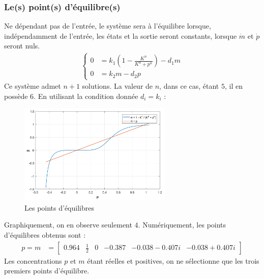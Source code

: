 \documentclass[a4paper, 12pt]{article}
\begin{document}
	\subsubsection{Le(s) point(s) d'équilibre(s)}
	Ne dépendant pas de l'entrée, le système sera à l'équilibre lorsque, indépendamment de l'entrée, les états et la sortie seront constants, \cad lorsque $\dot{m}$ et $\dot{p}$ seront nuls.
	\begin{align}
		\left\{
		\begin{aligned}
			0 & = {k}_{1}\left(1 - \frac{{K}^{n}}{{K}^{n} + {p}^{n}}\right) - {d}_{1}m \\
			0 & = {k}_{2}m - {d}_{2}p
		\end{aligned}
		\right.
	\end{align}
	Ce système admet $n + 1$ solutions. La valeur de $n$, dans ce cas, étant $5$, il en possède $6$. En utilisant la condition donnée ${d}_{i} = {k}_{i}$ :
	\begin{figure}[H]
		\centering
		\includegraphics[width = 0.65\textwidth]{resources/pdf/m2p.pdf}
		\caption{Les points d'équilibres}
	\end{figure}
	Graphiquement, on en observe seulement $4$. Numériquement, les points d'équilibres obtenus sont :
	\begin{align*}
		p = m & = 
		\begin{bmatrix}
			0.964 & \frac{1}{2} & 0 & -0.387  & -0.038 - 0.407i & -0.038 + 0.407i
		\end{bmatrix}
	\end{align*}
	Les concentrations $p$ et $m$ étant réelles et positives, on ne sélectionne que les trois premiers points d'équilibre.
\end{document}
